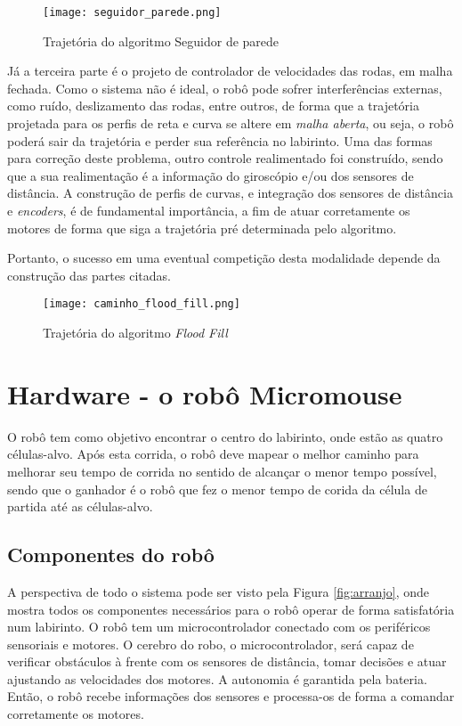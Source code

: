 \begin{figure}[!htb]
	\caption{\label{fig:traj_seguidor}Trajetória do algoritmo Seguidor de parede}
	\begin{center}
		\texttt{[image: seguidor\_parede.png]}
	\end{center}
\end{figure}


Já a terceira parte é o projeto de controlador de velocidades das rodas, em malha fechada. Como o sistema não é ideal, o robô pode sofrer interferências externas, como ruído, deslizamento das rodas, entre outros, de forma que a trajetória projetada para os perfis de reta e curva se altere em \emph{malha aberta}, ou seja, o robô poderá sair da trajetória e perder sua referência no labirinto. Uma das formas para correção deste problema, outro controle realimentado foi construído, sendo que a sua realimentação é a informação do giroscópio e/ou dos sensores de distância. A construção de perfis de curvas, e integração dos sensores de distância e \emph{encoders}, é de fundamental importância, a fim de atuar corretamente os motores de forma que siga a trajetória pré determinada pelo algoritmo.

Portanto, o sucesso em uma eventual competição desta modalidade depende da construção das partes citadas.

\begin{figure}[!htb]
	\caption{\label{fig:traj_flood}Trajetória do algoritmo \emph{Flood Fill}}
	\begin{center}
		\texttt{[image: caminho\_flood\_fill.png]}
	\end{center}
\end{figure}


\section{Hardware - o robô Micromouse}
O robô tem como objetivo encontrar o centro do labirinto, onde estão as quatro células-alvo. Após esta corrida, o robô deve mapear o melhor caminho para melhorar seu tempo de corrida no sentido de alcançar o menor tempo possível, sendo que o ganhador é o robô que fez o menor tempo de corida da célula de partida até as células-alvo.


\subsection{Componentes do robô}
A perspectiva de todo o sistema pode ser visto pela Figura \ref{fig:arranjo}, onde mostra todos os componentes necessários para o robô operar de forma satisfatória num labirinto. O robô tem um microcontrolador conectado com os periféricos sensoriais e motores. O cerebro do robo, o microcontrolador, será capaz de verificar obstáculos à frente com os sensores de distância, tomar decisões e atuar ajustando as velocidades dos motores. A autonomia é garantida pela bateria. Então, o robô recebe informações dos sensores e processa-os de forma a comandar corretamente os motores.


